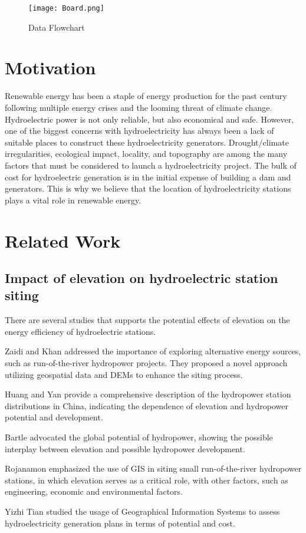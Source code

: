 \documentclass[11pt]{article}
\begin{document}
\begin{figure}[!h]
\texttt{[image: Board.png]}
\caption{Data Flowchart}
\label{fig:Fig1}
\end{figure}

\section{Motivation}
Renewable energy has been a staple of energy production for the past century following multiple energy crises and the looming threat of climate change. Hydroelectric power is not only reliable, but also economical and safe. However, one of the biggest concerns with hydroelectricity has always been a lack of suitable places to construct these hydroelectricity generators. Drought/climate irregularities, ecological impact, locality, and topography are among the many factors that must be considered to launch a hydroelectricity project. \cite{askari2015hydroprocon} The bulk of cost for hydroelectric generation is in the initial expense of building a dam and generators. This is why we believe that the location of hydroelectricity stations plays a vital role in renewable energy.

\section{Related Work}
\subsection{Impact of elevation on hydroelectric station siting}
There are several studies that supports the potential effects of elevation on the energy efficiency of hydroelectric stations. \par

Zaidi and Khan \cite{zaidi2018runofriver} addressed the importance of exploring alternative energy sources, such as run-of-the-river hydropower projects. They proposed a novel approach utilizing geospatial data and DEMs to enhance the siting process. \par
Huang and Yan  \cite{huang2009hydropowerchina} provide a comprehensive description of the hydropower station distributions in China, indicating the dependence of elevation and hydropower potential and development. \par
Bartle \cite{bartle2002hydropowerpotential} advocated the global potential of hydropower, showing the possible interplay between elevation and possible hydropower development. \par
Rojanamon \cite{rojanamon2009gis} emphasized the use of GIS in siting small run-of-the-river hydropower stations, in which elevation serves as a critical role, with other factors, such as engineering, economic and environmental factors. \par
Yizhi Tian \cite{TIAN20201393} studied the usage of Geographical Information Systems to assess hydroelectricity generation plans in terms of potential and cost.
\end{document}
